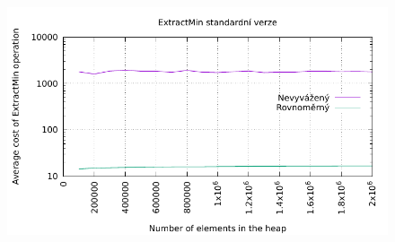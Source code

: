 \documentclass[12pt,a4paper]{report}
\begin{document}
	
	
	\begin{figure}[h]	
		\centering	
		\includegraphics[scale=1]{graph_1}		
	\end{figure}

	\begin{figure}[h]	
    \centering
		\qquad
    \end{figure}
\end{document}
